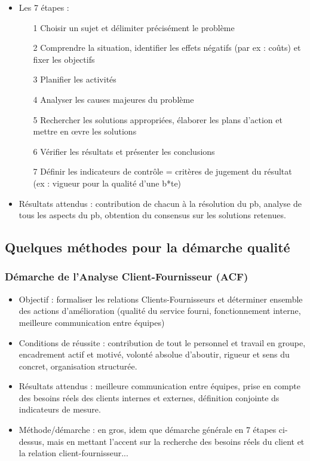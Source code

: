 \begin{itemize}
			\item Les 7 étapes : 
				\begin{itemize}
				\item[1] Choisir un sujet et délimiter précisément le problème
				\item[2] Comprendre la situation, identifier les effets négatifs (par ex : coûts) et fixer les objectifs
				\item[3] Planifier les activités
				\item[4] Analyser les causes majeures du problème
				\item[5] Rechercher les solutions appropriées, élaborer les plans d'action et mettre en \oe{}vre les solutions
				\item[6] Vérifier les résultats et présenter les conclusions
				\item[7] Définir les indicateurs de contrôle = critères de jugement du résultat (ex : vigueur pour la qualité d'une b*te) 
				\end{itemize}
			\item Résultats attendus : contribution de chacun à la résolution du pb, analyse de tous les aspects du pb, obtention du consensus sur les solutions retenues. 
			\end{itemize}
		\subsection{Quelques méthodes pour la démarche qualité}
			\subsubsection{Démarche de l'Analyse Client-Fournisseur (ACF)}
				\begin{itemize}
				\item Objectif : formaliser les relations Clients-Fournisseurs et déterminer ensemble des actions d'amélioration (qualité du service fourni, fonctionnement interne, meilleure communication entre équipes)
				\item Conditions de réussite : contribution de tout le personnel et travail en groupe, encadrement actif et motivé, volonté absolue d'aboutir, rigueur et sens du concret, organisation structurée. 
				\item Résultats attendus : meilleure communication entre équipes, prise en compte des besoins réels des clients internes et externes, définition conjointe ds indicateurs de mesure. 
				\item Méthode/démarche : en gros, idem que démarche générale en 7 étapes ci-dessus, mais en mettant l'accent sur la recherche des besoins réels du client et la relation client-fournisseur... 
				\end{itemize}
